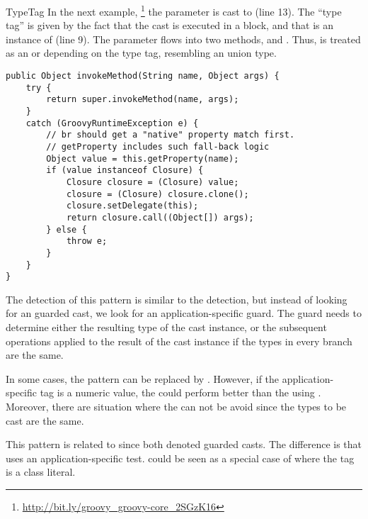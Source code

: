 \begin{pattern}{TypeTag}
In the next example,%
\footnote{\url{http://bit.ly/groovy_groovy-core_2SGzK16}}
the parameter  is cast to  (line 13).
The ``type tag'' is given by the fact that the cast is executed in a  block,
and that  is an instance of  (line 9).
The  parameter flows into two methods,
and
%
.
Thus,  is treated as an  or  depending on the type tag,
resembling an union type.

\begin{verbatim}
public Object invokeMethod(String name, Object args) {
    try {
        return super.invokeMethod(name, args);
    }
    catch (GroovyRuntimeException e) {
        // br should get a "native" property match first.
        // getProperty includes such fall-back logic
        Object value = this.getProperty(name);
        if (value instanceof Closure) {
            Closure closure = (Closure) value;
            closure = (Closure) closure.clone();
            closure.setDelegate(this);
            return closure.call((Object[]) args);
        } else {
            throw e;
        }
    }
}
\end{verbatim}


\detection{}
The detection of this pattern is similar to the  detection, but instead of looking for an  guarded cast, we look for an application-specific guard.
The guard needs to determine either the resulting type of the cast instance, or
the subsequent operations applied to the result of the cast instance if the types in every branch are the same.

\discussion{}
In some cases, the \thisp{} pattern can be replaced by .
However, if the application-specific tag is a numeric value,
the \thisp{} could perform better than the  using .
Moreover, there are situation where the \thisp{} can not be avoid since the types to be cast are the same.

\related{}
%
This pattern is related to  since both denoted guarded casts.
The difference is that \thisp{} uses an application-specific test.
 could be seen as a special case of \thisp{} where the tag is a class literal.

\end{pattern}